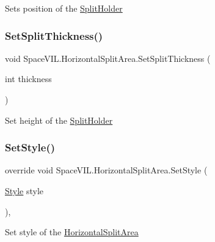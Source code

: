 Sets position of the \mbox{\hyperlink{class_space_v_i_l_1_1_split_holder}{Split\+Holder}} 

\mbox{\label{class_space_v_i_l_1_1_horizontal_split_area_a3e8b87474ea53742d5a84513f8867d4d}} 
\subsubsection{\texorpdfstring{Set\+Split\+Thickness()}{SetSplitThickness()}}
{\footnotesize\ttfamily void Space\+V\+I\+L.\+Horizontal\+Split\+Area.\+Set\+Split\+Thickness (\begin{DoxyParamCaption}\item[{int}]{thickness }\end{DoxyParamCaption})\hspace{0.3cm}{\ttfamily [inline]}}



Set height of the \mbox{\hyperlink{class_space_v_i_l_1_1_split_holder}{Split\+Holder}} 

\mbox{\label{class_space_v_i_l_1_1_horizontal_split_area_a6731dd096f00f78595ea45d8993bc636}} 
\subsubsection{\texorpdfstring{Set\+Style()}{SetStyle()}}
{\footnotesize\ttfamily override void Space\+V\+I\+L.\+Horizontal\+Split\+Area.\+Set\+Style (\begin{DoxyParamCaption}\item[{\mbox{\hyperlink{class_space_v_i_l_1_1_decorations_1_1_style}{Style}}}]{style }\end{DoxyParamCaption})\hspace{0.3cm}{\ttfamily [inline]}, {\ttfamily [virtual]}}



Set style of the \mbox{\hyperlink{class_space_v_i_l_1_1_horizontal_split_area}{Horizontal\+Split\+Area}} 



